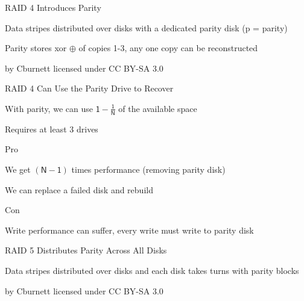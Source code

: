   \begin{frame}{RAID 4 Introduces Parity}

    Data stripes distributed over disks with a dedicated parity disk (p = parity)

    \hspace{2em} Parity stores xor $\oplus$ of copies 1-3, any one copy can be
                 reconstructed

    \begin{center}
      
    \end{center}

    \begin{flushright}
      by Cburnett licensed under CC BY-SA 3.0
    \end{flushright}
  \end{frame}

  \begin{frame}{RAID 4 Can Use the Parity Drive to Recover}

    With parity, we can use $\mathsf{1 - \frac{1}{N}}$ of the available space

    \hspace{2em} Requires at least 3 drives

    \vspace{2em}

    Pro

    \hspace{2em} We get $\mathsf{(N - 1)}$ times performance
                 (removing parity disk)

    \hspace{2em} We can replace a failed disk and rebuild

    \vspace{2em}

    Con

    \hspace{2em} Write performance can suffer, every write must write to parity
                 disk
  \end{frame}

  \begin{frame}{RAID 5 Distributes Parity Across All Disks}

    Data stripes distributed over disks and each disk takes turns with parity
    blocks
    \begin{center}
      
    \end{center}

    \begin{flushright}
      by Cburnett licensed under CC BY-SA 3.0
    \end{flushright}
  \end{frame}

